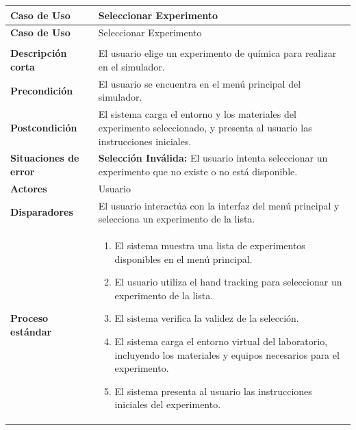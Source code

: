 \begin{longtable}{>{\raggedright\arraybackslash}m{} >{\raggedright\arraybackslash}m{}}
    \toprule\toprule
    \textbf{Caso de Uso} & Seleccionar Experimento \\
    \midrule\midrule
    \endfirsthead

    \toprule\toprule
    \textbf{Caso de Uso} & Seleccionar Experimento \\
    \midrule\midrule
    \endhead

    \midrule
    \multicolumn{2}{r}{\textit{Continúa en la siguiente página}} \\
    \midrule
    \endfoot

    \endlastfoot

    \textbf{Descripción corta} & El usuario elige un experimento de química para realizar en el simulador. \\
    \midrule
    \textbf{Precondición} & El usuario se encuentra en el menú principal del simulador. \\
    \midrule
    \textbf{Postcondición} & El sistema carga el entorno y los materiales del experimento seleccionado, y presenta al usuario las instrucciones iniciales. \\
    \midrule
    \textbf{Situaciones de error} & \textbf{Selección Inválida:} El usuario intenta seleccionar un experimento que no existe o no está disponible.  \\
    \midrule
    \textbf{Actores} & Usuario \\
    \midrule
    \textbf{Disparadores} & El usuario interactúa con la interfaz del menú principal y selecciona un experimento de la lista. \\
    \midrule
    \textbf{Proceso estándar} &
    \begin{enumerate}
        \item El sistema muestra una lista de experimentos disponibles en el menú principal. 
        \item El usuario utiliza el hand tracking para seleccionar un experimento de la lista. 
        \item El sistema verifica la validez de la selección. 
        \item El sistema carga el entorno virtual del laboratorio, incluyendo los materiales y equipos necesarios para el experimento. 
        \item El sistema presenta al usuario las instrucciones iniciales del experimento. 
    \end{enumerate} \\

\end{longtable}

